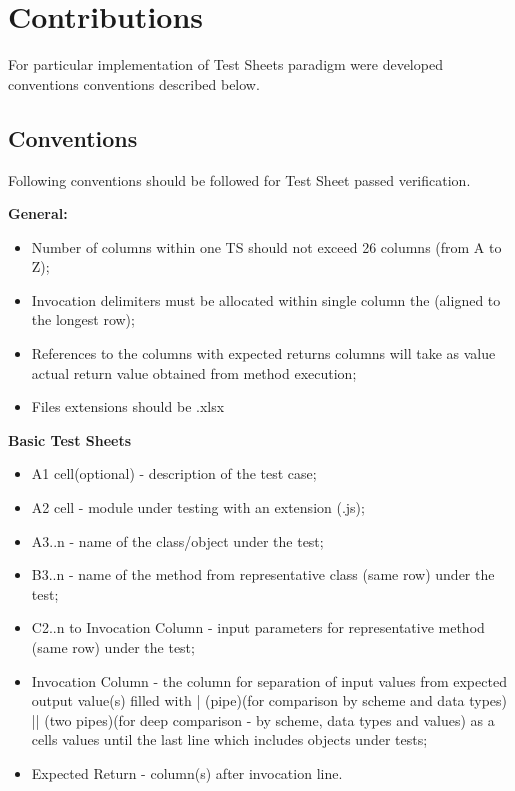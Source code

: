 \chapter{Contributions}
\label{sec:contributions}
For particular implementation of Test Sheets paradigm were developed conventions conventions described below. 
\section{Conventions}
\label{sec:conventions}

Following conventions should be followed for Test Sheet passed verification.

\textbf{General:}
\begin{itemize}
\item Number of columns within one TS should not exceed 26 columns (from A to Z);
\item Invocation delimiters must be allocated within single column the (aligned to the longest row);
\item References to the columns with expected returns columns will take as value actual return value obtained from method execution;
\item Files extensions should be .xlsx\\
\end{itemize}

\textbf{ Basic Test Sheets} 
\begin{itemize}
\item A1 cell(optional) - description of the test case;
\item A2 cell - module under testing with an extension (.js);
\item A3..n - name of the class/object under the test;
\item B3..n - name of the method from representative class (same row) under the test;
\item C2..n to Invocation Column - input parameters for representative method (same row) under the test;
\item Invocation Column - the column for separation of input values from expected output value(s) filled with | (pipe)(for comparison by scheme and data types) || (two pipes)(for deep comparison - by scheme, data types and values) as a cells values until the last line which includes objects under tests;
\item Expected Return - column(s) after invocation line.\\
\end{itemize}

